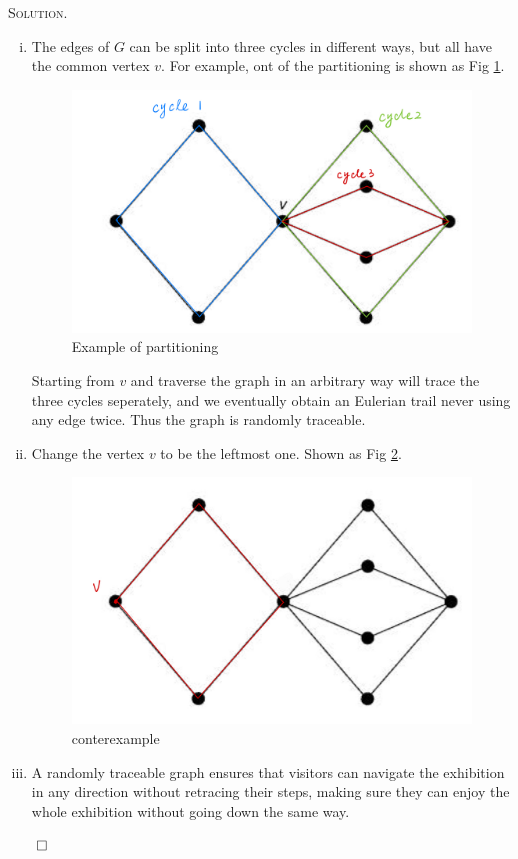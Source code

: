 \documentclass[12pt, a4paper, oneside]{ctexart}
\newenvironment{solution}{%
	\par\noindent\textsc{Solution. }\ignorespaces
}{%
	\hfill$\qed$\par
}
\begin{document}
	\begin{solution}
		
		\begin{enumerate}[(i)]
			\item The edges of $G$ can be split into three cycles in different ways, but all have the common vertex $v$. For example, ont of the partitioning is shown as Fig \ref{fig:partitioning}.
			\begin{figure}[H]
				\small
				\centering
				\includegraphics[width=0.5\columnwidth]{figure/fig4.png}
				\caption{Example of partitioning}
				\label{fig:partitioning}
			\end{figure}
			Starting from $v$ and traverse the graph in an arbitrary way will trace the three cycles seperately,
			and we eventually obtain an Eulerian trail never using any edge twice. Thus the graph is randomly traceable.

			\item Change the vertex $v$ to be the leftmost one. Shown as Fig \ref{fig:conterexample}.
			\begin{figure}[H]
				\small
				\centering
				\includegraphics[width=0.5\columnwidth]{figure/fig5.png}
				\caption{conterexample}
				\label{fig:conterexample}
			\end{figure}

			\item A randomly traceable graph ensures that visitors can navigate the exhibition in any direction without retracing their steps, making sure they can enjoy the whole exhibition without going down the same way.
		\end{enumerate}
		
		
	\end{solution}
	
\end{document}
